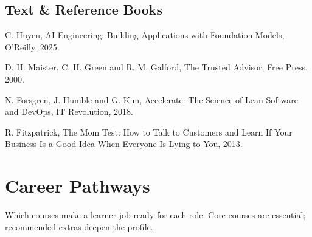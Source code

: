 \documentclass[10pt,a4paper]{article}
\begin{document}
\subsection*{Text \& Reference Books}{\footnotesize\begin{enumerate}[label={[\arabic*]}]
\item C. Huyen, AI Engineering: Building Applications with Foundation Models, O’Reilly, 2025.
\item D. H. Maister, C. H. Green and R. M. Galford, The Trusted Advisor, Free Press, 2000.
\item N. Forsgren, J. Humble and G. Kim, Accelerate: The Science of Lean Software and DevOps, IT Revolution, 2018.
\item R. Fitzpatrick, The Mom Test: How to Talk to Customers and Learn If Your Business Is a Good Idea When Everyone Is Lying to You, 2013.
\end{enumerate}}
\newpage\section*{Career Pathways}
Which courses make a learner job-ready for each role. Core courses are essential; recommended extras deepen the profile.
\end{document}
